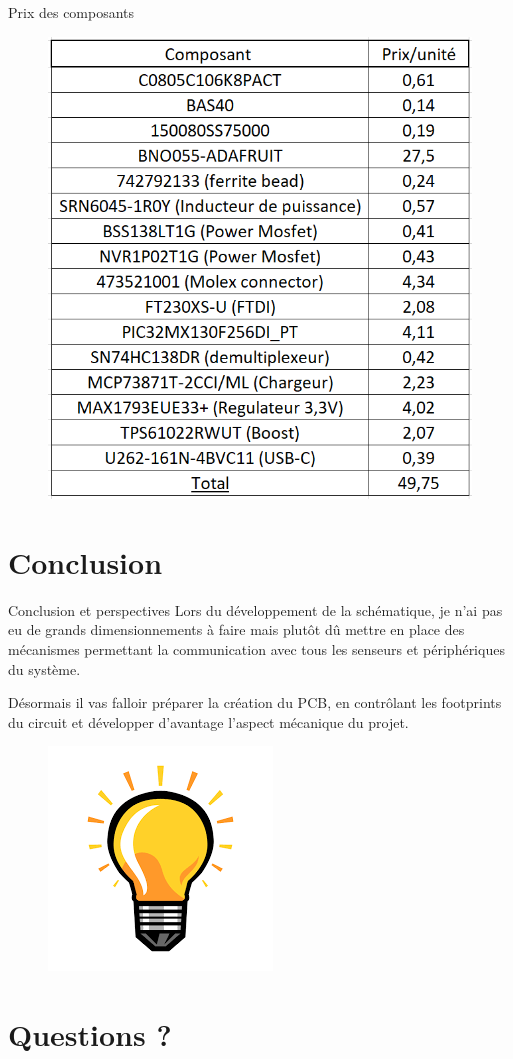\documentclass[compress,aspectratio=169]{beamer}
\begin{document}
\begin{frame}[containsverbatim]{Prix des composants}
	\begin{figure}
		\centering
		\label{fig:bomavecprix}
		\includegraphics[width=0.45\linewidth]{Images/Dev-SCH/BOMavecPrix}
	\end{figure}
\end{frame}

\section{Conclusion}

\begin{frame}[containsverbatim]{Conclusion et perspectives}
	Lors du développement de la schématique, je n’ai pas eu de grands
	dimensionnements à faire mais plutôt dû mettre en place des mécanismes
	permettant la communication avec tous les senseurs et périphériques du
	système.
	
	Désormais il vas falloir préparer la création du PCB, en contrôlant les
	footprints du circuit et développer d’avantage l’aspect mécanique du projet.
	
	\begin{figure}
		\centering
		\label{fig:lightbulb}
		\includegraphics[width=0.15\linewidth]{Images/Dev-SCH/lightbulb}
	\end{figure}
	
	
\end{frame}

\section{Questions ?}
\end{document}
